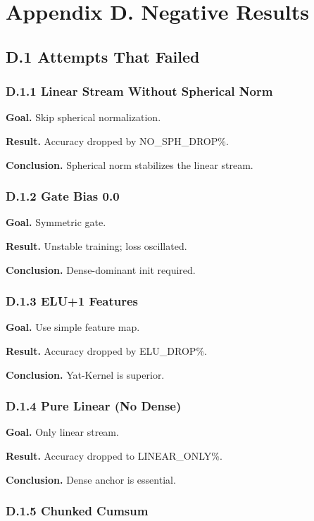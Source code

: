 \section{Appendix D. Negative Results}

\subsection{D.1 Attempts That Failed}

\subsubsection{D.1.1 Linear Stream Without Spherical Norm}

\textbf{Goal.} Skip spherical normalization.

\textbf{Result.} Accuracy dropped by {{NO\_SPH\_DROP}}\%.

\textbf{Conclusion.} Spherical norm stabilizes the linear stream.

\subsubsection{D.1.2 Gate Bias 0.0}

\textbf{Goal.} Symmetric gate.

\textbf{Result.} Unstable training; loss oscillated.

\textbf{Conclusion.} Dense-dominant init required.

\subsubsection{D.1.3 ELU+1 Features}

\textbf{Goal.} Use simple feature map.

\textbf{Result.} Accuracy dropped by {{ELU\_DROP}}\%.

\textbf{Conclusion.} Yat-Kernel is superior.

\subsubsection{D.1.4 Pure Linear (No Dense)}

\textbf{Goal.} Only linear stream.

\textbf{Result.} Accuracy dropped to {{LINEAR\_ONLY}}\%.

\textbf{Conclusion.} Dense anchor is essential.

\subsubsection{D.1.5 Chunked Cumsum}

